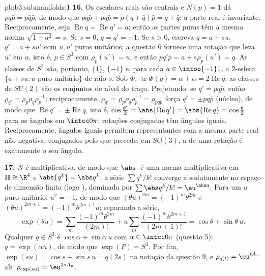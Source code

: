 \begin{solution}{pb:b3:submanifolds:1}
\textbf{16.} Os escalares reais são centrais e $N(p) = 1$ dá
$\overline{pq\bar p} = p\bar q\bar p$, de modo que $pq\bar p +
\overline{pq\bar p} = p(q + \bar q)\bar p = q + \bar q$:
a parte real é invariante. Reciprocamente, seja
$\operatorname{Re}q = \operatorname{Re}q' = a$; então as
partes puras têm a mesma norma $\sqrt{1 - a^2} = s$. Se $s =
0$, $q = q' = \pm1$. Se $s > 0$, escreva $q = a + su$, $q' =
a + su'$ com $u, u'$ puros unitários; a questão 6 fornece uma
rotação que leva $u'$ em $u$, isto é, $p \in S^3$ com
$\rho_p(u') = u$, e então $pq'\bar p = a + s\rho_p(u') =
q$. As classes de $S^3$ são, portanto, $\{1\}$, $\{-1\}$
e, para cada $a \in \intoo{-1}1$, a $2$-esfera $\{a + su :
u \text{ puro unitário}\}$ de raio $s$. Sob $\Phi$,
$\operatorname{tr}\Phi(q) = \alpha + \bar\alpha =
2\operatorname{Re}q$: as classes de $SU(2)$ são os conjuntos de nível
do traço. Projetando: se $q' = pq\bar p$, então
$\rho_{q'} = \rho_p\rho_q\rho_p^{-1}$; reciprocamente,
$\rho_{q'} = \rho_p\rho_q\rho_p^{-1} = \rho_{pq\bar p}$
força $q' = \pm pq\bar p$ (núcleo), de modo que
$\operatorname{Re}q' = \pm\operatorname{Re}q$, isto é,
$\cos\frac{\theta'}2 = \abs{\operatorname{Re}q'} =
\abs{\operatorname{Re}q} = \cos\frac\theta2$ para os ângulos
em $\intcc0\pi$: rotações conjugadas têm ângulos iguais.
Reciprocamente, ângulos iguais permitem representantes com a
mesma parte real não negativa, conjugados pelo que precede: em
$SO(3)$, a  de uma rotação é exatamente o seu
ângulo.

\textbf{17.} $N$ é multiplicativa, de modo que $\abs\cdot$ é uma
norma multiplicativa em $\mathbb H \cong \R^4$ e
$\abs{q^k} = \abs q^k$: a série $\sum q^k/k!$ converge
absolutamente no espaço de dimensão finita (logo ),
dominada por $\sum\abs q^k/k! = \eu^{\abs q}$. Para um
$u$ puro unitário: $u^2 = -1$, de modo que $(\theta u)^{2m} =
(-1)^m\theta^{2m}$ e $(\theta u)^{2m+1} =
(-1)^m\theta^{2m+1}u$; separando a série,
\[
\exp(\theta u) = \sum_m\frac{(-1)^m\theta^{2m}}{(2m)!} +
u\sum_m\frac{(-1)^m\theta^{2m+1}}{(2m+1)!} = \cos\theta +
\sin\theta\,u .
\]
Qualquer $q \in S^3$ é $\cos\alpha + \sin\alpha\,u$ com
$\alpha \in \intcc0\pi$ (questão 5): $q = \exp(\alpha u)$,
de modo que $\exp(P) = S^3$. Por fim, $\exp(su) = \cos s + \sin s\,u
= q(2s)$ na notação da questão 9, e $\rho_{q(t)} =
\eu^{tA_u}$ ali: $\rho_{\exp(su)} = \eu^{2sA_u}$.


\end{solution}
